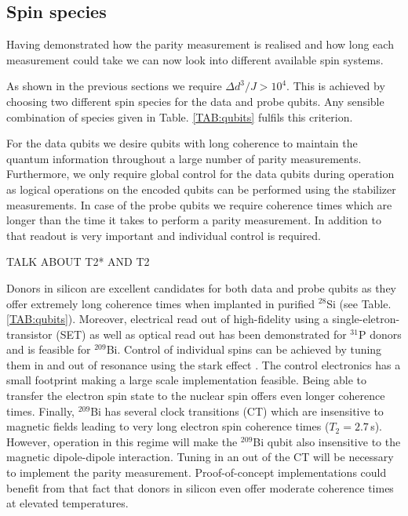 
\subsection{Spin species}

Having demonstrated how the parity measurement is realised and how long each measurement could take we can now look into different available spin systems. 

As shown in the previous sections we require $\Delta d^3/ J > 10^4$. This is achieved by choosing two different spin species for the data and probe qubits. Any sensible combination of species given in Table. \ref*{TAB:qubits} fulfils this criterion.

For the data qubits we desire qubits with long coherence to maintain the quantum information throughout a large number of parity measurements. Furthermore, we only require global control for the data qubits during operation as logical operations on the encoded qubits can be performed using the stabilizer measurements.
In case of the probe qubits we require coherence times which are longer than the time it takes to perform a parity measurement. In addition to that readout is very important and individual control is required.

TALK ABOUT T2* AND T2

Donors in silicon are excellent candidates for both data and probe qubits as they offer extremely long coherence times when implanted in purified $^{28}$Si (see Table. \ref{TAB:qubits}). Moreover, electrical read out of high-fidelity using a single-eletron-transistor (SET) \cite{Pla2012,Pla2013,Muhonen2014} as well as optical \cite{Lo2015} read out has been demonstrated for $^{31}$P donors and is feasible for $^{209}$Bi. Control of individual spins can be achieved by tuning them in and out of resonance using the stark effect \cite{Pica2014}. The control electronics has a small footprint making a large scale implementation feasible. Being able to transfer the electron spin state to the nuclear spin offers even longer coherence times. Finally, $^{209}$Bi has several clock transitions (CT) which are insensitive to magnetic fields leading to very long electron spin coherence times ($T_2=2.7\, $s). However, operation in this regime will make the $^{209}$Bi qubit also insensitive to the magnetic dipole-dipole interaction. Tuning in an out of the CT will be necessary to implement the parity measurement. Proof-of-concept implementations could benefit from that fact that donors in silicon even offer moderate coherence times at elevated temperatures.

